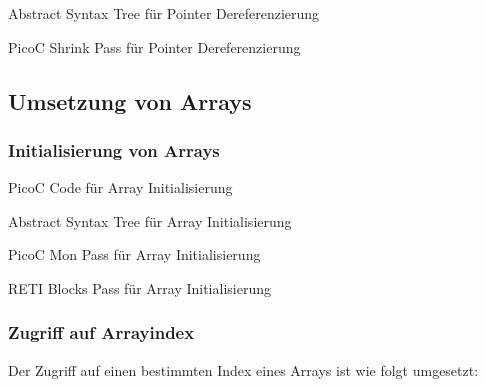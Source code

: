 \begin{code}
  \centering
  \caption{Abstract Syntax Tree für Pointer Dereferenzierung}
  \label{fig:abstract_syntax_tree_für_pointer_dereferenzierung}
\end{code}

\begin{code}
  \centering
  \caption{PicoC Shrink Pass für Pointer Dereferenzierung}
  \label{fig:picoc_shrink_für_pointer_dereferenzierung}
\end{code}

\subsection{Umsetzung von Arrays}
\subsubsection{Initialisierung von Arrays}
\begin{code}
  \centering
  \caption{PicoC Code für Array Initialisierung}
  \label{fig:picoc_code_für_array_initialisierung}
\end{code}

\begin{code}
  \centering
  \caption{Abstract Syntax Tree für Array Initialisierung}
  \label{fig:abstract_syntax_tree_für_array_initialisierung}
\end{code}

\begin{code}
  \centering
  \caption{PicoC Mon Pass für Array Initialisierung}
  \label{fig:picoc_mon_für_array_initialisierung}
\end{code}

\begin{code}
  \centering
  \caption{RETI Blocks Pass für Array Initialisierung}
  \label{fig:reti_blocks_für_array_initialisierung}
\end{code}


\subsubsection{Zugriff auf Arrayindex}
Der Zugriff auf einen bestimmten  Index eines Arrays ist wie folgt umgesetzt:

